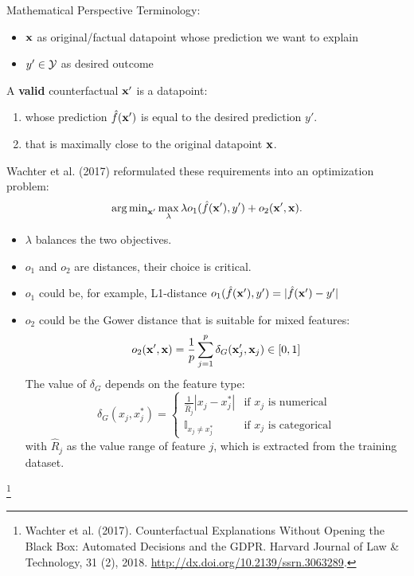 \documentclass[11pt,compress,t,notes=noshow, xcolor=table]{beamer}
\begin{document}
\begin{vbframe}{Mathematical Perspective}
	Terminology: 
	\begin{itemize}
		\item $\xv$ as original/factual datapoint whose prediction we want to explain
		\item $y' \in \Yspace$ as desired outcome 
	\end{itemize}
	\vspace{0.3cm}
	A \textbf{valid} counterfactual $\xv'$ is a datapoint: 
	\begin{enumerate}
		\item whose prediction $\fh(\xv')$ is equal to the desired prediction $y'$. 
		\item that is maximally close to the original datapoint $\xv$.
	\end{enumerate}
	Wachter et al. (2017) reformulated these requirements into an optimization problem: 
	\begin{equation}
		\argmin_{\xv'} \max_{\lambda} \lambda o_1(\fh(\xv'), y') + o_2(\xv', \xv).
		\label{eq:wachter}
	\end{equation}
	\begin{itemize}
		\item $\lambda$ balances the two objectives.
		\item $o_1$ and $o_2$ are distances, their choice is critical.
		\framebreak
		\item $o_1$ could be, for example, L1-distance $o_1(\fh(\xv'), y') = |\fh(\xv')-y'|$
		\item $o_2$ could be the Gower distance that is suitable for mixed features: 
		$$o_2(\xv', \xv) = \frac{1}{p}\sum_{j = 1}^{p} \delta_G(\xv'_j, \xv_j)\in [0, 1]$$
		The value of $\delta_G$ depends on the feature type:
		\begin{equation*}
		\delta_G(x_j, x^*_j) = 
		\begin{cases}
		\frac{1}{\widehat{R}_j}|x_j- x^*_j| & \text{if $x_j$ is numerical} \\
		\mathbb{I}_{x_j \neq x_j^*} & \text{if $x_j$ is categorical}
		\end{cases}
		\end{equation*}
		with $\widehat{R}_j$ as the value range of feature $j$, which is extracted from the training dataset. 
	\end{itemize}

\footnote[frame]{Wachter et al. (2017). Counterfactual Explanations Without Opening the Black Box: Automated Decisions and the GDPR. Harvard Journal of Law \& Technology, 31 (2), 2018. \url{http://dx.doi.org/10.2139/ssrn.3063289}.}
\end{vbframe}
\end{document}
